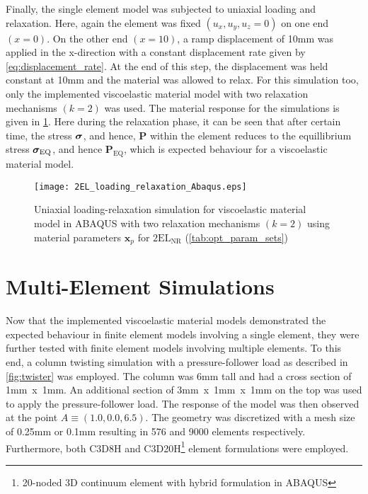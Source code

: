 Finally, the single element model was subjected to uniaxial loading and relaxation. Here, again the element was fixed \((u_{x}, u_{y}, u_{z} = 0)\) on one end \((x=0)\). On the other end \((x=10)\), a ramp displacement of 10mm was applied in the x-direction with a constant displacement rate given by \cref{eq:displacement_rate}. At the end of this step, the displacement was held constant at 10mm and the material was allowed to relax. For this simulation too, only the implemented viscoelastic material model with two relaxation mechanisms \((k=2)\) was used. The material response for the simulations is given in \cref{fig:loading_relaxation_abaqus}. Here during the relaxation phase, it can be seen that after certain time, the stress \(\bm{\sigma}\), and hence, \(\mathbf{P}\) within the element reduces to the equillibrium stress \(\bm{\sigma}_{\text{EQ}}\), and hence \(\mathbf{P}_{\mathrm{EQ}}\), which is expected behaviour for a viscoelastic material model. 

\begin{figure}[htbp]
    \centering
    \texttt{[image: 2EL\_loading\_relaxation\_Abaqus.eps]}
    \caption[Uniaxial loading and relaxation simulation]{Uniaxial loading-relaxation simulation for viscoelastic material model in ABAQUS  with two relaxation mechanisms \((k=2)\) using material parameters \(\bm{x}_{p}\) for \(2\mathrm{EL}_{\mathrm{NR}}\) (\cref{tab:opt_param_sets})}%
    \label{fig:loading_relaxation_abaqus}
\end{figure}

\section{Multi-Element Simulations}
Now that the implemented viscoelastic material models demonstrated the expected behaviour in finite element models involving a single element, they were further tested with finite element models involving multiple elements. To this end, a column twisting simulation with a pressure-follower load as described in \cref{fig:twister} was employed\cite{Bonet2015Jan}. The column was 6mm tall and had a cross section of 1mm~x~1mm. An additional section of 3mm~x~1mm~x~1mm on the top was used to apply the pressure-follower load. The response of the model was then observed at the point \(A \equiv (1.0, 0.0, 6.5)\). The geometry was discretized with a mesh size of 0.25mm or 0.1mm resulting in 576 and 9000 elements respectively. Furthermore, both C3D8H and C3D20H\footnote[1]{20-noded 3D continuum element with hybrid formulation in ABAQUS} element formulations were employed.

